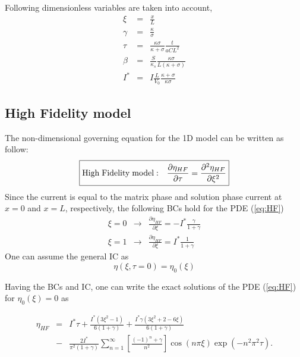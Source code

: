 \documentclass[]{article}
\begin{document}
Following dimensionless variables are taken into account, 
%
\begin{eqnarray}
\xi &=& \frac{x}{L}\\
\gamma &=& \frac{\kappa}{\sigma}\\
\tau &=& \frac{\kappa\sigma}{\kappa+\sigma}\frac{t}{aCL^2}\\
\beta &=& \frac{S}{\kappa_s}\frac{\kappa\sigma}{L(\kappa+\sigma)}\\
I^* &=& I \frac{L}{V_0}\frac{\kappa+\sigma}{\kappa\sigma} \label{eq:Iscale}
\end{eqnarray}
%


\subsection{High Fidelity model}

The non-dimensional governing equation for the 1D model can be written as follow: 
%
\begin{equation}\label{eq:HF}
\boxed{
{\rm High \; Fidelity \; model: \quad}
\frac{\partial\eta_{HF}}{\partial\tau} = \frac{\partial^2\eta_{HF}}{\partial\xi^2}
}
\end{equation}
%
Since the current is equal to the matrix phase and solution phase current at $x=0$ and $x=L$, respectively, the following BCs hold for the PDE (\ref{eq:HF})
%
\begin{eqnarray}\label{eq:HF_bcs}
\xi = 0 &\rightarrow& \frac{\partial\eta_{HF}}{\partial\xi}=-I^*\frac{\gamma}{1+\gamma}\\
\xi = 1 &\rightarrow& \frac{\partial\eta_{HF}}{\partial\xi}= I^*\frac{1}{1+\gamma} \nonumber
\end{eqnarray}
%
One can assume the general IC as 
%
\begin{equation}
\eta(\xi,\tau=0) = \eta_0(\xi)
\end{equation}
%

Having the BCs and IC,
one can write the exact solutions of the PDE (\ref{eq:HF}) for $\eta_0(\xi)=0$ as 

\begin{eqnarray}\label{eq:exactHF}
\eta_{HF} &=& I^*\tau + \frac{I^*(3\xi^2-1)}{6(1+\gamma)} + \frac{I^*\gamma(3\xi^2+2-6\xi)}{6(1+\gamma)}\\
	 &-& \frac{2I^*}{\pi^2(1+\gamma)} \sum_{n=1}^\infty \left[\frac{(-1)^n+\gamma}{n^2} \right] \cos(n\pi\xi) \exp(-n^2\pi^2\tau). \nonumber
\end{eqnarray}
\end{document}

